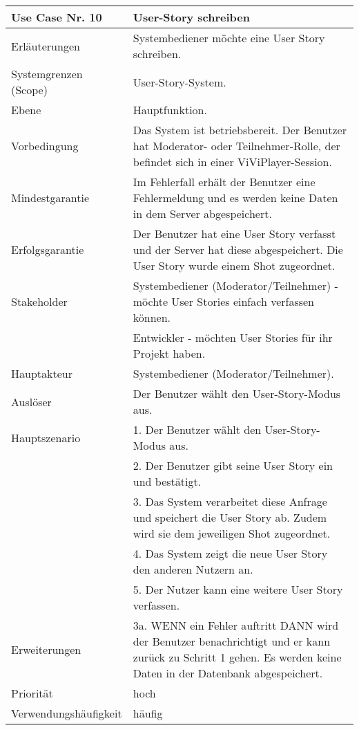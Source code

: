 \begin{tabularx}{\linewidth}{|l|X|}
	\hline
	Use Case Nr. 10			& \textbf{User-Story schreiben} \\ \hline
	Erläuterungen			& Systembediener möchte eine User Story schreiben. \\ \hline
	Systemgrenzen (Scope)	& User-Story-System. \\ \hline
	Ebene					& Hauptfunktion. \\ \hline
	Vorbedingung			& Das System ist betriebsbereit. Der Benutzer hat Moderator- oder 
							  Teilnehmer-Rolle, der befindet sich in einer ViViPlayer-Session. \\ \hline
	Mindestgarantie			& Im Fehlerfall erhält der Benutzer eine Fehlermeldung und es 
							  werden keine Daten in dem Server abgespeichert. \\ \hline
	Erfolgsgarantie			& Der Benutzer hat eine User Story verfasst und der Server hat
							  diese abgespeichert. Die User Story wurde einem Shot
							  zugeordnet. \\ \hline
	Stakeholder				& Systembediener (Moderator/Teilnehmer) - möchte User Stories 
							  einfach verfassen können.\\ 
                            & Entwickler - möchten User Stories für ihr Projekt haben. \\ 
                              \hline
	Hauptakteur				& Systembediener (Moderator/Teilnehmer). \\ \hline
	Auslöser				& Der Benutzer wählt den User-Story-Modus aus. \\ \hline	
	Hauptszenario			& 1. Der Benutzer wählt den User-Story-Modus aus. \\
							& 2. Der Benutzer gibt seine User Story ein und bestätigt. \\
							& 3. Das System verarbeitet diese Anfrage und speichert die User 
							  Story ab. Zudem wird sie dem jeweiligen Shot zugeordnet. \\
							& 4. Das System zeigt die neue User Story den anderen Nutzern an.\\
							& 5. Der Nutzer kann eine weitere User Story verfassen. \\ \hline
	Erweiterungen			& 3a. WENN ein Fehler auftritt DANN wird der Benutzer 
	                          benachrichtigt und er kann zurück zu Schritt 1 gehen. Es werden keine Daten in der Datenbank abgespeichert. \\ \hline
	Priorität				& hoch \\ \hline
	Verwendungshäufigkeit	& häufig \\ \hline
\end{tabularx}
